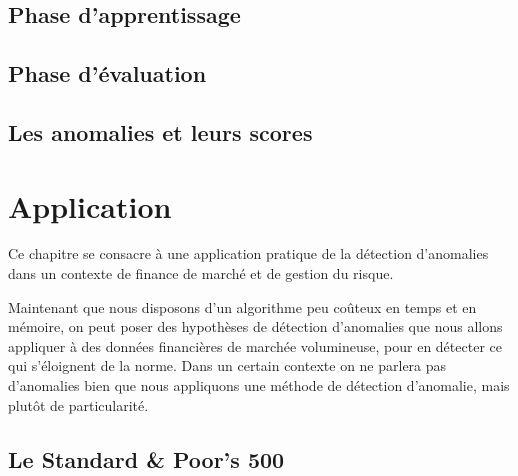 \section{Phase d'apprentissage}

\section{Phase d'évaluation}

\section{Les anomalies et leurs scores}

\chapter{Application}

Ce chapitre se consacre à une application pratique de la détection d'anomalies dans un contexte de finance de marché et de gestion du risque. 

Maintenant que nous disposons d'un algorithme peu coûteux en temps et en mémoire, on peut poser des hypothèses de détection d'anomalies que nous allons appliquer à des données financières de marchée volumineuse, pour en détecter ce qui s'éloignent de la norme. Dans un certain contexte on ne parlera pas d'anomalies bien que nous appliquons une méthode de détection d'anomalie, mais plutôt de particularité.

\section{Le Standard \& Poor's 500}


